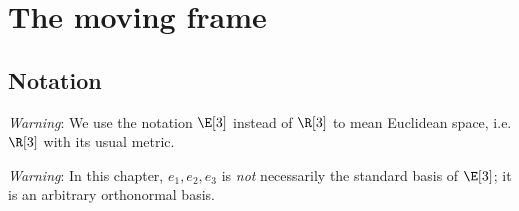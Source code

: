 \chapter{The moving frame}\label{chapter:moving.frame}%

\section{Notation}
\emph{Warning}: We use the notation \(\E[3]\) instead of \(\R[3]\) to mean Euclidean space, i.e. \(\R[3]\) with its usual metric.

\medskip

\par\noindent
\emph{Warning}: In this chapter, \(e_1, e_2, e_3\) is \emph{not} necessarily the standard basis of \(\E[3]\); it is an arbitrary orthonormal basis.

